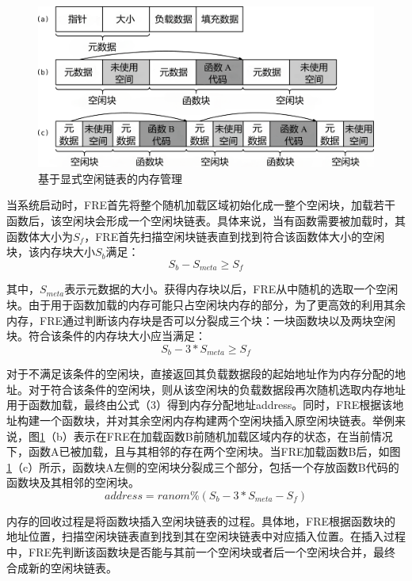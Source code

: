\documentclass[UTF8,12pt,a4paper,twoside]{ctexart}
\numberwithin{figure}{section}
\begin{document}
\begin{figure}
    \centering
    \includegraphics[scale=0.23]{graph/memoryManagement.png}
    \caption{基于显式空闲链表的内存管理}
    \label{fig:memoryManagement}
\end{figure}
\par 当系统启动时，FRE首先将整个随机加载区域初始化成一整个空闲块，加载若干函数后，该空闲块会形成一个空闲块链表。具体来说，当有函数需要被加载时，其函数体大小为$S_f$​，FRE首先扫描空闲块链表直到找到符合该函数体大小的空闲块，该内存块大小$S_b$​满足：
\begin{equation}
    S_b-S_{meta}≥S_f \label{1}
\end{equation}
\par 其中，$S_{meta}$表示元数据的大小。获得内存块以后，FRE从中随机的选取一个空闲块。由于用于函数加载的内存可能只占空闲块内存的部分，为了更高效的利用其余内存，FRE通过判断该内存块是否可以分裂成三个块：一块函数块以及两块空闲块。符合该条件的内存块大小应当满足：
\begin{equation}
    S_b-3*S_{meta}≥S_f
\end{equation}
\par 对于不满足该条件的空闲块，直接返回其负载数据段的起始地址作为内存分配的地址。对于符合该条件的空闲块，则从该空闲块的负载数据段再次随机选取内存地址用于函数加载，最终由公式（3）得到内存分配地址address。同时，FRE根据该地址构建一个函数块，并对其余空闲内存构建两个空闲块插入原空闲块链表。举例来说，图\ref{fig:memoryManagement}（b）表示在FRE在加载函数B前随机加载区域内存的状态，在当前情况下，函数A已被加载，且与其相邻的存在两个空闲块。当FRE加载函数B后，如图\ref{fig:memoryManagement}（c）所示，函数块A左侧的空闲块分裂成三个部分，包括一个存放函数B代码的函数块及其相邻的空闲块。
\begin{equation}
    address=ranom\%(S_b-3*S_{meta}-S_f)
\end{equation}
\par 内存的回收过程是将函数块插入空闲块链表的过程。具体地，FRE根据函数块的地址位置，扫描空闲块链表直到找到其在空闲块链表中对应插入位置。在插入过程中，FRE先判断该函数块是否能与其前一个空闲块或者后一个空闲块合并，最终合成新的空闲块链表。
\end{document}
